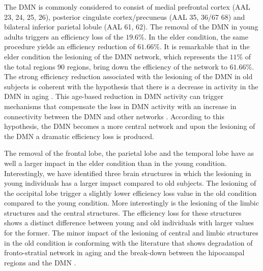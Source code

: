 \documentclass[12pt,a4paper]{article}
\begin{document}
The DMN is commonly considered to consist of medial prefrontal cortex
(AAL 23, 24, 25, 26), posterior cingulate cortex/precuneus (AAL 35, 36/67 68)
and bilateral inferior parietal lobule (AAL 61, 62). 
The removal of the DMN in
young adults triggers an efficiency loss of the $19.6\%$. In the elder condition, the same procedure yields an efficiency reduction of $61.66\%$. It is remarkable that in the elder condition the lesioning of the DMN network, which represents the $11\%$ of the total regions 90 regions, bring down the efficiency of the network to $61.66\%$.
The strong efficiency reduction associated with the lesioning of the DMN in old subjects is coherent with the hypothesis that there is a decrease in activity in the DMN in aging \cite{koch_effects_2010}. This age-based reduction in DMN activity can trigger mechanisms that compensate the loss in DMN activity with an increase in connectivity between the DMN and other networks \cite{damoiseaux_reduced_2008}. According to this hypothesis, the DMN becomes a more central network and upon the lesioning of the DMN a dramatic efficiency loss is produced. 


The removal of the frontal lobe, the parietal lobe and the temporal lobe have as well a larger impact in the elder condition than in the young condition. 
Interestingly, we have identified three brain structures in which the lesioning in young individuals has a larger impact compared to old subjects. The lesioning of the occipital lobe trigger a slightly lower efficiency loss value in the old condition compared to the young condition. More interestingly is the lesioning of the limbic structures and the central structures. The efficiency loss for these structures shows a distinct difference between young and old individuals with larger values for the former. The minor impact of the lesioning of central and limbic structures in the old condition is conforming with the literature that shows degradation of fronto-stratial network in aging \cite{salami_elevated_2014} and the break-down between the hipocampal regions and the DMN \cite{fjell_brain_2015}. 
\end{document}
